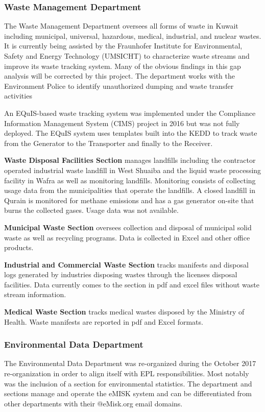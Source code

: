 \subsubsection{Waste Management Department}
The Waste Management Department oversees all forms of waste in Kuwait including municipal, universal, hazardous, medical, industrial, and nuclear wastes. It is currently being assisted by the  Fraunhofer Institute for Environmental, Safety and Energy Technology (UMSICHT) to characterize waste streams and improve its waste tracking system. Many of the obvious findings in this gap analysis will be corrected by this project. The department works with the Environment Police to identify unauthorized dumping and waste transfer activities

An EQuIS-based waste tracking system was implemented under the Compliance Information Management System (CIMS) project in 2016 but was not fully deployed. The EQuIS system uses templates built into the KEDD to track waste from the Generator to the Transporter and finally to the Receiver.

\textbf{Waste Disposal Facilities Section} manages landfills including the contractor operated industrial waste landfill in West Shuaiba and the liquid waste processing facility in Wafra as well as monitoring landfills. Monitoring consists of collecting usage data from the municipalities that operate the landfills. A closed landfill in Qurain is monitored for methane emissions and has a gas generator on-site that burns the collected gases. Usage data was not available.

\textbf{Municipal Waste Section} oversees collection and disposal of municipal solid waste as well as recycling programs. Data is collected in Excel and other office products.

\textbf{Industrial and Commercial Waste Section} tracks manifests and disposal logs generated by industries disposing wastes through the licenses disposal facilities. Data currently comes to the section in pdf and excel files without waste stream information.

\textbf{Medical Waste Section} tracks medical wastes disposed by the Ministry of Health. Waste manifests are reported in pdf and Excel formats.

\subsubsection{Environmental Data Department}
The Environmental Data Department was re-organized during the October 2017 re-organization in order to align itself with EPL responsibilities. Most notably was the inclusion of a section for environmental statistics. The department and sections manage and operate the  eMISK system and can be differentiated from other departments with their @eMisk.org email domains.  

